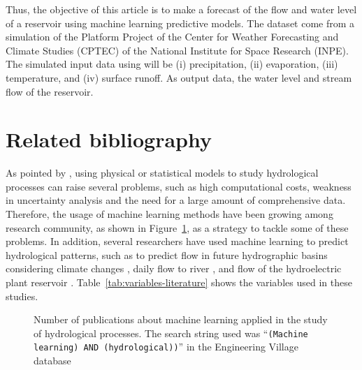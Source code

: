 \documentclass[12pt]{article}
\begin{document}
Thus, the objective of this article is to make a forecast of the flow and water level of a reservoir using machine learning predictive models. The dataset come from a simulation of the Platform Project of the Center for Weather Forecasting and Climate Studies (CPTEC) of the National Institute for Space Research (INPE). The simulated input data using will be (i) precipitation, (ii) evaporation, (iii) temperature, and (iv) surface runoff. As output data, the water level and stream flow of the reservoir.

\section{Related bibliography}

As pointed by \cite{ardabili2019deep}, using physical or statistical models to study hydrological processes can raise several problems, such as high computational costs, weakness in uncertainty analysis and the need for a large amount of comprehensive data. Therefore, the usage of machine learning methods have been growing among research community, as shown in Figure~\ref{fig:num_publications}, as a strategy to tackle some of these problems.
In addition, several researchers have used machine learning to predict hydrological patterns, such as to predict flow in future hydrographic basins considering climate changes \cite{bhatta2019evaluation}, daily flow to river \cite{kassem2020predicting}, and flow of the hydroelectric plant reservoir \cite{essenfelder2020smart}. Table~\ref{tab:variables-literature} shows the variables used in these studies.

\begin{figure}[htb]
    \centering
    \caption{Number of publications about machine learning applied in the study of hydrological processes. The search string used was ``\texttt{(Machine learning) AND (hydrological))}'' in the Engineering Village database}
    \label{fig:num_publications}
\end{figure}
\end{document}
